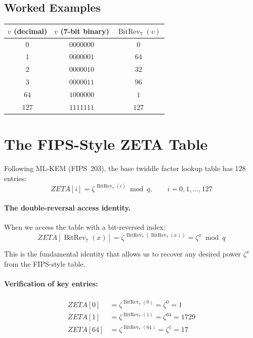\documentclass[11pt,a4paper]{article}
\newcommand{\brev}[1]{\operatorname{BitRev}_{7}\!\left(#1\right)}
\begin{document}
\subsection{Worked Examples}

\begin{center}
\begin{tabular}{ccc}
\toprule
$v$ (decimal) & $v$ (7-bit binary) & $\brev{v}$ \\
\midrule
$0$  & $0000000$ & $0 $  \\
$1$  & $0000001$ & $64$  \\
$2$  & $0000010$ & $32$  \\
$3$  & $0000011$ & $96$  \\
$64$ & $1000000$ & $1 $  \\
$127$& $1111111$ & $127$ \\
\bottomrule
\end{tabular}
\end{center}

\section{The FIPS-Style ZETA Table}
\label{sec:zeta-table}

Following ML-KEM (FIPS~203), the base twiddle factor lookup table has 128 entries:
\begin{equation}
  \boxed{ZETA[i] = \zeta^{\,\brev{i}} \bmod q, \qquad i = 0, 1, \ldots, 127}
  \label{eq:zeta-table}
\end{equation}

\paragraph{The double-reversal access identity.}
When we access the table with a bit-reversed index:
\begin{equation}
  ZETA\!\left[\brev{x}\right] = \zeta^{\,\brev{\brev{x}}} = \zeta^{x} \bmod q
  \label{eq:access-identity}
\end{equation}

This is the fundamental identity that allows us to recover any desired power $\zeta^x$ from the FIPS-style table.

\paragraph{Verification of key entries:}
\begin{align*}
  ZETA[0]  &= \zeta^{\brev{0}}  = \zeta^{0}  = 1 \\
  ZETA[1]  &= \zeta^{\brev{1}}  = \zeta^{64} = 1729 \\
  ZETA[64] &= \zeta^{\brev{64}} = \zeta^{1}  = 17
\end{align*}
\end{document}
